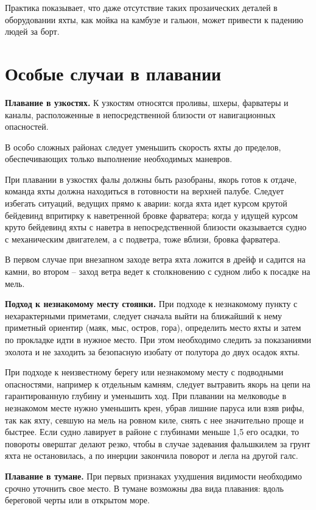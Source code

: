 \documentclass[a4paper, 12pt, twoside, final, book, russian, fittopage, cyremdash]{ncc}
\begin{document}
Практика показывает, что даже отсутствие таких прозаических деталей в оборудовании яхты, как мойка на камбузе и гальюн, может привести к падению людей за борт.

\section{Особые случаи в плавании}

\textbf{Плавание в узкостях.} К узкостям относятся проливы, шхеры, фарватеры и каналы, расположенные в непосредственной близости от навигационных опасностей.

В особо сложных районах следует уменьшить скорость яхты до пределов, обеспечивающих только выполнение необходимых маневров.

При плавании в узкостях фалы должны быть разобраны, якорь готов к отдаче, команда яхты должна находиться в готовности на верхней палубе. Следует избегать ситуаций, ведущих прямо к аварии: когда яхта идет курсом крутой бейдевинд впритирку к наветренной бровке фарватера; когда у идущей курсом круто бейдевинд яхты с наветра в непосредственной близости оказывается судно с механическим двигателем, а с подветра, тоже вблизи, бровка фарватера.

В первом случае при внезапном заходе ветра яхта ложится в дрейф и садится на камни, во втором \--- заход ветра ведет к столкновению с судном либо к посадке на мель.

\textbf{Подход к незнакомому месту стоянки.} При подходе к незнакомому пункту с нехарактерными приметами, следует сначала выйти на ближайший к нему приметный ориентир (маяк, мыс, остров, гора), определить место яхты и затем по прокладке идти в нужное место. При этом необходимо следить за показаниями эхолота и не заходить за безопасную изобату от полутора до двух осадок яхты.

При подходе к неизвестному берегу или незнакомому месту с подводными опасностями, например к отдельным камням, следует вытравить якорь на цепи на гарантированную глубину и уменьшить ход. При плавании на мелководье в незнакомом месте нужно уменьшить крен, убрав лишние паруса или взяв рифы, так как яхту, севшую на мель на ровном киле, снять с нее значительно проще и быстрее. Если судно лавирует в районе с глубинами меньше 1,5 его осадки, то повороты оверштаг делают резко, чтобы в случае задевания фальшкилем за грунт яхта не остановилась, а по инерции закончила поворот и легла на другой галс.

\textbf{Плавание в тумане.} При первых признаках ухудшения видимости необходимо срочно уточнить свое место. В тумане возможны два вида плавания: вдоль береговой черты или в открытом море.
\end{document}
